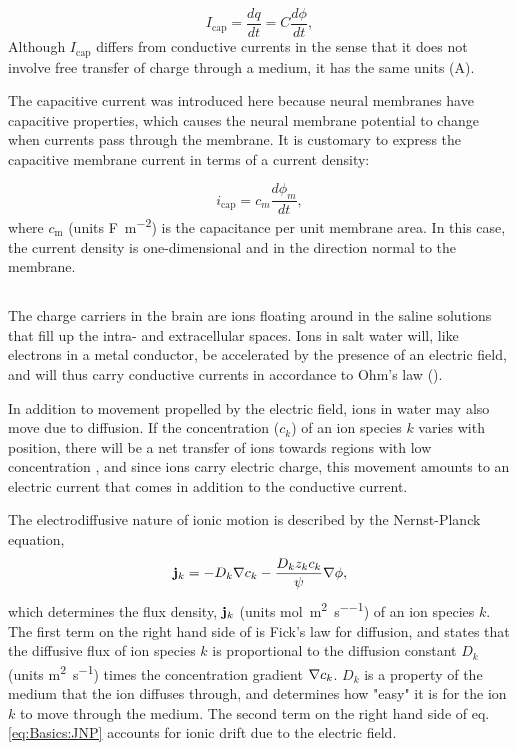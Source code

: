 \begin{equation}
I_\text{cap} = \frac{dq}{dt} = C\frac{d\phi}{dt},
\label{eq:Basics:Icap}
\end{equation}
Although $I_\text{cap}$ differs from conductive currents in the sense that it does not involve free transfer of charge through a medium, it has the same units (A).

The capacitive current was introduced here because neural membranes have capacitive properties, which causes the neural membrane potential to change when currents pass through the membrane. It is customary to express the capacitive membrane current in terms of a current density:

\begin{equation}
i_\text{cap} = c_m\frac{d\phi_m}{dt},
\label{eq:Basics:Icap_mem}
\end{equation}
where $c_\text{m}$ (units \si{\farad\per\square\metre}) is the capacitance per unit membrane area. In this case, the current density is one-dimensional and in the direction normal to the membrane.


\subsection{}
\label{sec:Basics:DiffusiveCurrent}
 
The charge carriers in the brain are ions floating around in the saline solutions that fill up the intra- and extracellular spaces. Ions in salt water will, like electrons in a metal conductor, be accelerated by the presence of an electric field, and will thus carry conductive currents in accordance to Ohm's law ().

In addition to movement propelled by the electric field, ions in water may also move due to diffusion. If the concentration ($c_k$) of an ion species $k$ varies with position, there will be a net transfer of ions towards regions with low concentration , and since ions carry electric charge, this movement amounts to an electric current that comes in addition to the conductive current. 

The electrodiffusive  nature of ionic motion is described by the Nernst-Planck equation,
\begin{equation}
{\bf j}_k = - D_k {\bf \nabla} c_{k} - \frac{D_k z_k c_k}{\psi} {\bf \nabla} \phi,
\label{eq:Basics:JNP}
\end{equation}
which determines the flux density, ${\bf j}_k$ (units \si{\mole\per\square\metre\per\second}) of an ion species $k$. The first term on the right hand side of  is Fick's law for diffusion, and states that the diffusive flux of ion species $k$ is proportional to the diffusion constant ${D}_k$ (units \si{\square\metre\per\second}) times the concentration gradient ${\bf \nabla} c_{k}$. ${D}_k$ is a property of the medium that the ion diffuses through, and determines how "easy" it is for the ion $k$ to move through the medium. The second term on the right hand side of eq. \ref{eq:Basics:JNP} accounts for ionic drift due to the electric field. 

